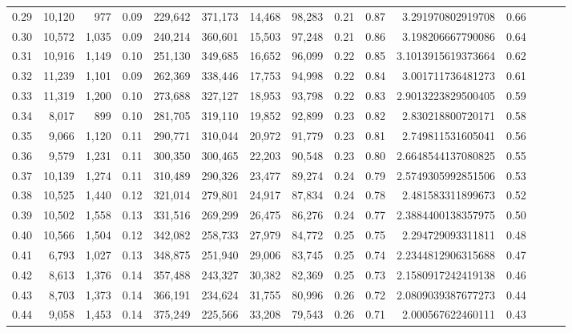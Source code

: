 \begin{tabular}{rrrrrrrrrrrrrrr}
0.29 &  10,120 &    977 &  0.09 &  229,642 &  371,173 &   14,468 &   98,283 &  0.21 &  0.87 &    3.291970802919708 &      0.66 \\
0.30 &  10,572 &  1,035 &  0.09 &  240,214 &  360,601 &   15,503 &   97,248 &  0.21 &  0.86 &    3.198206667790086 &      0.64 \\
0.31 &  10,916 &  1,149 &  0.10 &  251,130 &  349,685 &   16,652 &   96,099 &  0.22 &  0.85 &   3.1013915619373664 &      0.62 \\
0.32 &  11,239 &  1,101 &  0.09 &  262,369 &  338,446 &   17,753 &   94,998 &  0.22 &  0.84 &    3.001711736481273 &      0.61 \\
0.33 &  11,319 &  1,200 &  0.10 &  273,688 &  327,127 &   18,953 &   93,798 &  0.22 &  0.83 &   2.9013223829500405 &      0.59 \\
0.34 &   8,017 &    899 &  0.10 &  281,705 &  319,110 &   19,852 &   92,899 &  0.23 &  0.82 &    2.830218800720171 &      0.58 \\
0.35 &   9,066 &  1,120 &  0.11 &  290,771 &  310,044 &   20,972 &   91,779 &  0.23 &  0.81 &    2.749811531605041 &      0.56 \\
0.36 &   9,579 &  1,231 &  0.11 &  300,350 &  300,465 &   22,203 &   90,548 &  0.23 &  0.80 &   2.6648544137080825 &      0.55 \\
0.37 &  10,139 &  1,274 &  0.11 &  310,489 &  290,326 &   23,477 &   89,274 &  0.24 &  0.79 &   2.5749305992851506 &      0.53 \\
0.38 &  10,525 &  1,440 &  0.12 &  321,014 &  279,801 &   24,917 &   87,834 &  0.24 &  0.78 &    2.481583311899673 &      0.52 \\
0.39 &  10,502 &  1,558 &  0.13 &  331,516 &  269,299 &   26,475 &   86,276 &  0.24 &  0.77 &   2.3884400138357975 &      0.50 \\
0.40 &  10,566 &  1,504 &  0.12 &  342,082 &  258,733 &   27,979 &   84,772 &  0.25 &  0.75 &    2.294729093311811 &      0.48 \\
0.41 &   6,793 &  1,027 &  0.13 &  348,875 &  251,940 &   29,006 &   83,745 &  0.25 &  0.74 &   2.2344812906315688 &      0.47 \\
0.42 &   8,613 &  1,376 &  0.14 &  357,488 &  243,327 &   30,382 &   82,369 &  0.25 &  0.73 &   2.1580917242419138 &      0.46 \\
0.43 &   8,703 &  1,373 &  0.14 &  366,191 &  234,624 &   31,755 &   80,996 &  0.26 &  0.72 &   2.0809039387677273 &      0.44 \\
0.44 &   9,058 &  1,453 &  0.14 &  375,249 &  225,566 &   33,208 &   79,543 &  0.26 &  0.71 &    2.000567622460111 &      0.43 \\

\end{tabular}
